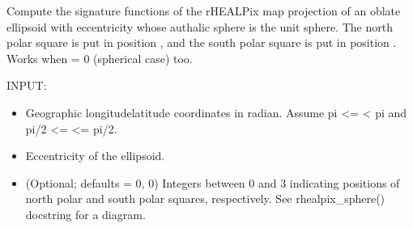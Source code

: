 \documentclass[a4paper,12ptopenany,oneside,english]{sphinxmanual}
\begin{document}
\begin{fulllineitems}
\label{\detokenize{pj_rhealpix:rhealpixdggs.pj_rhealpix.rhealpix_ellipsoid}}
\pysigstartsignatures
{}
\pysigstopsignatures
\sphinxAtStartPar
Compute the signature functions of the rHEALPix map
projection of an oblate ellipsoid with eccentricity  whose
authalic sphere is the unit sphere.
The north polar square is put in position ,
and the south polar square is put in position .
Works when  = 0 (spherical case) too.

\sphinxAtStartPar
INPUT:
\begin{itemize}
\item {} 
\sphinxAtStartPar
{} \sphinxhyphen{} Geographic longitude\sphinxhyphen{}latitude coordinates in radian.
Assume \sphinxhyphen{}pi \textless{}=  \textless{} pi and \sphinxhyphen{}pi/2 \textless{}=  \textless{}= pi/2.

\item {} 
\sphinxAtStartPar
{} \sphinxhyphen{} Eccentricity of the ellipsoid.

\item {} 
\sphinxAtStartPar
{} \sphinxhyphen{} (Optional; defaults = 0, 0) Integers
between 0 and 3 indicating positions of north polar and
south polar squares, respectively.
See rhealpix\_sphere() docstring for a diagram.

\end{itemize}


\end{fulllineitems}
\end{document}
